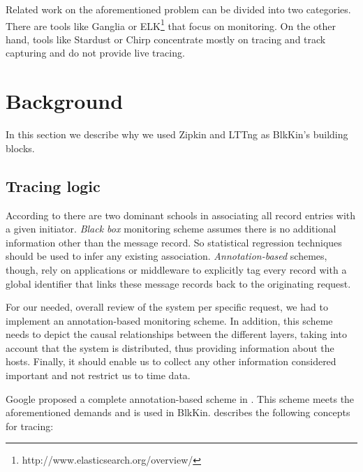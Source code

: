 \documentclass[11pt,journal,compsoc]{IEEEtran}
\begin{document}
Related work on the aforementioned problem can be divided into two categories.
There are tools like Ganglia\cite{ganglia} or
ELK\footnote{http://www.elasticsearch.org/overview/} that focus on monitoring.
On the other hand, tools like Stardust\cite{stardust} or
Chirp\cite{hp} concentrate mostly on tracing and track capturing and do not
provide live tracing.

\section{Background}
In this section we describe why we used Zipkin and LTTng as BlkKin's building
blocks.

\subsection{Tracing logic}
According to \cite{dapper} there are two dominant schools in associating all
record entries with a given initiator. \emph{Black box} monitoring scheme
assumes there is no additional information other than the message record. So
statistical regression techniques should be used to infer any existing
association. \emph{Annotation-based} schemes, though, rely on applications or
middleware to explicitly tag every record with a global identifier that links
these message records back to the originating request.

For our needed, overall review of the system per specific request, we had to
implement an annotation-based monitoring scheme. In addition, this scheme needs
to depict the causal relationships between the different layers, taking into
account that the system is distributed, thus providing information about the
hosts. Finally, it should enable us to collect any other information considered
important and not restrict us to time data.

Google proposed a complete annotation-based scheme in \cite{dapper}.
This scheme meets the aforementioned demands and is used in
BlkKin. \cite{dapper} describes the following concepts for tracing:
\end{document}
